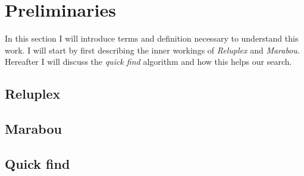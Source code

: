 \documentclass[../main.tex]{subfiles}
\begin{document}
\section{Preliminaries}
In this section I will introduce terms and definition necessary to understand this work. I will start by first describing the inner workings of \textit{Reluplex} and \textit{Marabou}. Hereafter I will discuss the \textit{quick find} algorithm and how this helps our search.

\subsection{Reluplex}

\subsection{Marabou}

\subsection{Quick find}
\end{document}
